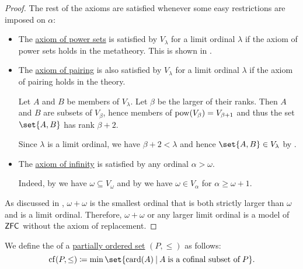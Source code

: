 \begin{proof}
  The rest of the axioms are satisfied whenever some easy restrictions are imposed on \( \alpha \):
  \begin{itemize}
    \item The \hyperref[def:zfc/power_set]{axiom of power sets} is satisfied by \( V_\lambda \) for a limit ordinal \( \lambda \) if the axiom of power sets holds in the metatheory. This is shown in .

    \item The \hyperref[def:zfc/pairing]{axiom of pairing} is also satisfied by \( V_\lambda \) for a limit ordinal \( \lambda \) if the axiom of pairing holds in the theory.

    Let \( A \) and \( B \) be members of \( V_\lambda \). Let \( \beta \) be the larger of their ranks. Then \( A \) and \( B \) are subsets of \( V_\beta \), hence members of \( \operatorname{pow}(V_\beta) = V_{\beta + 1} \) and thus the set \( \set{ A, B } \) has rank \( \beta + 2 \).

    Since \( \lambda \) is a limit ordinal, we have \( \beta + 2 < \lambda \) and hence \( \set{ A, B } \in V_\lambda \) by .

    \item The \hyperref[def:zfc/infinity]{axiom of infinity} is satisfied by any ordinal \( \alpha > \omega \).

    Indeed, by  we have \( \omega \subseteq V_\omega \) and by  we have \( \omega \in V_\alpha \) for \( \alpha \geq \omega + 1 \).
  \end{itemize}

  As discussed in , \( \omega + \omega \) is the smallest ordinal that is both strictly larger than \( \omega \) and is a limit ordinal. Therefore, \( \omega + \omega \) or any larger limit ordinal is a model of \( \textsf{ZFC} \) without the axiom of replacement.
\end{proof}

\begin{definition}\label{def:cofinality}
  We define the  of a \hyperref[def:partially_ordered_set]{partially ordered set} \( (P, \leq) \) as follows:
  \begin{equation*}
     \op{cf}(P, \leq) \coloneqq \min\set{ \card(A) \given A \T{is a cofinal subset of} P }.
  \end{equation*}
\end{definition}

